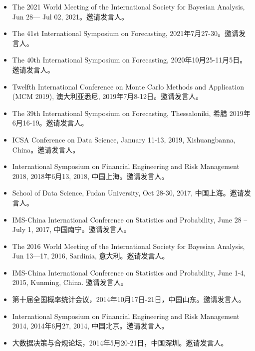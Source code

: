 \documentclass[twoside,a4paper,10.5pt]{article}
\begin{document}
\begin{itemize}

\item The 2021 World Meeting of the International Society for Bayesian Analysis, Jun
  28— Jul 02, 2021。邀请发言人。

\item The 41st International Symposium on Forecasting, 2021年7月27-30。邀请发言人。

\item The 40th International Symposium on Forecasting,  2020年10月25-11月5日。邀请发言人。

\item Twelfth International Conference on Monte Carlo Methods and Application (MCM 2019),
  澳大利亚悉尼, 2019年7月8-12日。邀请发言人。

\item The 39th International Symposium on Forecasting, Thessaloniki, 希腊 2019年6月16-19。邀请发言人。

\item ICSA Conference on Data Science, January 11-13, 2019, Xishuangbanna, China。邀请发言人。

\item International Symposium on Financial Engineering and Risk Management 2018, 2018年6月13,
  2018, 中国上海。邀请发言人。

\item School of Data Science, Fudan University, Oct 28-30, 2017, 中国上海。邀请发言人。

\item IMS-China International Conference on Statistics and Probability, June 28 – July 1,
  2017, 中国南宁。邀请发言人。


\item The 2016 World Meeting of the International Society for Bayesian Analysis, Jun
  13—17, 2016, Sardinia, 意大利。邀请发言人。

\item IMS-China International Conference on Statistics and Probability, June 1-4, 2015,
  Kunming, China. 邀请发言人。

\item 第十届全国概率统计会议，2014年10月17日-21日，中国山东。邀请发言人。

\item International Symposium on Financial Engineering and Risk Management 2014, 2014年6月27,
  2014, 中国北京。邀请发言人。

\item 大数据决策与合规论坛，2014年5月20-21日，中国深圳。邀请发言人。


\end{itemize}
\end{document}
